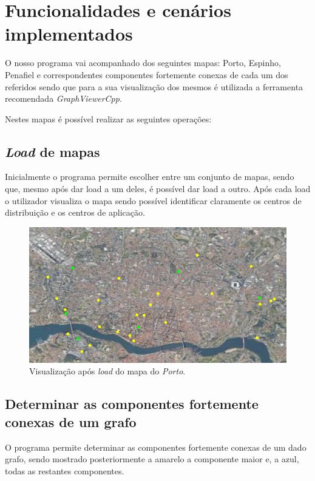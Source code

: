 \documentclass[12pt,a4paper]{report}
\begin{document}
\chapter{Funcionalidades e cenários implementados}
\label{func}
O nosso programa vai acompanhado dos seguintes mapas: Porto, Espinho, Penafiel e correspondentes componentes
fortemente conexas de cada um dos referidos sendo que para a sua visualização dos mesmos é utilizada 
a ferramenta recomendada \textit{GraphViewerCpp}. \par

Nestes mapas é possível realizar as seguintes operações:

\section{\textit{Load} de mapas}
Inicialmente o programa permite escolher entre um conjunto de mapas, sendo que, mesmo após dar load a um deles, é
possível dar load a outro. Após cada load o utilizador visualiza o mapa sendo possível identificar claramente
os centros de distribuição e os centros de aplicação.

\begin{figure}[H]
	\includegraphics[width=1.0\textwidth]{./imgs/funcs/load.png}
	\centering
	\caption{Visualização após \textit{load} do mapa do \textit{Porto}.}
\end{figure}


\section{Determinar as componentes fortemente conexas de um grafo}
O programa permite determinar as componentes fortemente conexas de um dado grafo, sendo mostrado posteriormente
a amarelo a componente maior e, a azul, todas as restantes componentes.
\end{document}
